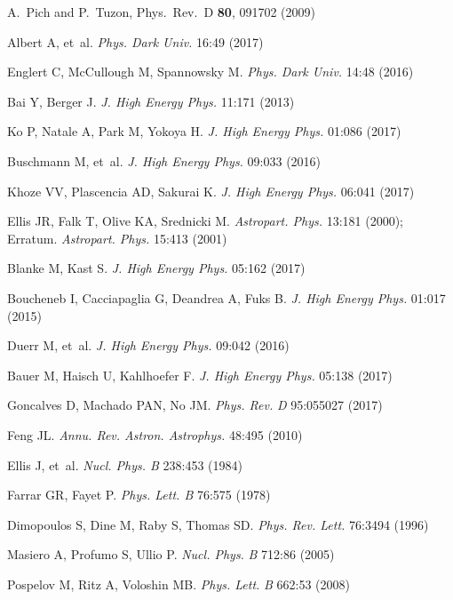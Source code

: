 \documentclass{ar-1col}
\begin{document}
\begin{thebibliography}{175}
  A.~Pich and P.~Tuzon, Phys.\ Rev.\ D {\bf 80}, 091702 (2009)

Albert A, et~al. \textit{Phys. Dark Univ.} 16:49 (2017)

Englert C, McCullough M, Spannowsky M. \textit{Phys. Dark Univ.}
14:48 (2016)

Bai Y, Berger J. \textit{J. High Energy Phys.} 11:171 (2013)

Ko P, Natale A, Park M, Yokoya H. \textit{J. High Energy Phys.} 01:086 (2017)

Buschmann M, et~al. \textit{J. High Energy Phys.} 09:033 (2016)

Khoze VV, Plascencia AD, Sakurai K. \textit{J. High Energy Phys.} 06:041 (2017)

Ellis JR, Falk T, Olive KA, Srednicki M. \textit{Astropart. Phys.}
13:181 (2000); Erratum. \textit{Astropart. Phys.} 15:413 (2001)

Blanke M, Kast S. \textit{J. High Energy Phys.} 05:162 (2017)

Boucheneb I, Cacciapaglia G, Deandrea A, Fuks B. \textit{J. High Energy Phys.}
01:017 (2015)

Duerr M, et~al. \textit{J. High Energy Phys.} 09:042 (2016)

Bauer M, Haisch U, Kahlhoefer F. \textit{J. High Energy Phys.} 05:138 (2017)

Goncalves D, Machado PAN, No JM. \textit{Phys. Rev.} \textit{D} 95:055027
(2017)

Feng JL. \textit{Annu. Rev. Astron. Astrophys.} 48:495 (2010)

{Ellis} J, et~al. \textit{Nucl. Phys. B} 238:453 (1984)

Farrar GR, Fayet P. \textit{Phys. Lett. B} 76:575 (1978)

Dimopoulos S, Dine M, Raby S, Thomas SD. \textit{Phys. Rev. Lett.}
76:3494 (1996)

Masiero A, Profumo S, Ullio P. \textit{Nucl. Phys.} \textit{B} 712:86 (2005)

Pospelov M, Ritz A, Voloshin MB. \textit{Phys. Lett.} \textit{B} 662:53
(2008)


\end{thebibliography}
\end{document}
